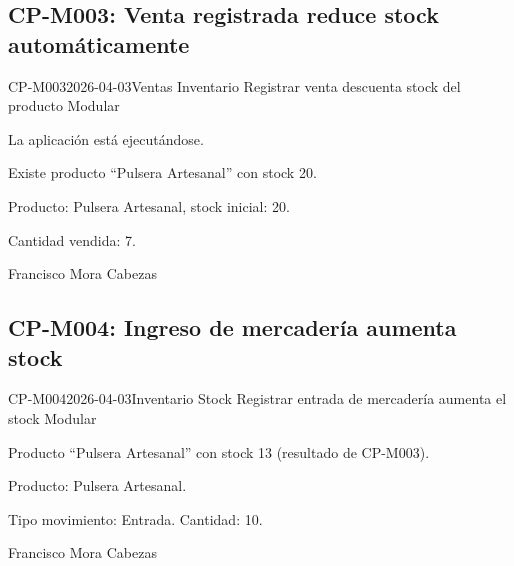 \subsection{CP-M003: Venta registrada reduce stock automáticamente}
\def\cpPasos{%
  \item Verificar stock inicial en ``Inventario'': 20.
  \item Navegar a ``Ventas'' \arr{} nueva venta.
  \item Agregar ``Pulsera Artesanal'' con cantidad 7.
  \item Confirmar la venta.
  \item Volver a ``Inventario'' y verificar nuevo stock.}
\def\cpResultadoE{%
  \item Stock pasa de 20 a 13 automáticamente.}
\def\cpResultadoO{El stock se redujo de 20 a 13 correctamente. La interrelación
  Ventas \arr{} Inventario funciona.}
\casoprueba
  {CP-M003}{2026-04-03}{Ventas \arr{} Inventario}
  {Registrar venta descuenta stock del producto}
  {Modular}{\estadoAprobado}
  {\item La aplicación está ejecutándose.
   \item Existe producto ``Pulsera Artesanal'' con stock 20.}
  {\item Producto: Pulsera Artesanal, stock inicial: 20.
   \item Cantidad vendida: 7.}
  {Francisco Mora Cabezas}

\subsection{CP-M004: Ingreso de mercadería aumenta stock}
\def\cpPasos{%
  \item Navegar a ``Inventario'' \arr{} registrar entrada.
  \item Seleccionar ``Pulsera Artesanal'', cantidad 10.
  \item Confirmar el movimiento.
  \item Verificar nuevo stock.}
\def\cpResultadoE{%
  \item Stock sube de 13 a 23.}
\def\cpResultadoO{El stock subió correctamente de 13 a 23. El módulo de movimientos
  de inventario actualiza el stock correctamente.}
\casoprueba
  {CP-M004}{2026-04-03}{Inventario \arr{} Stock}
  {Registrar entrada de mercadería aumenta el stock}
  {Modular}{\estadoAprobado}
  {\item Producto ``Pulsera Artesanal'' con stock 13 (resultado de CP-M003).}
  {\item Producto: Pulsera Artesanal.
   \item Tipo movimiento: Entrada. Cantidad: 10.}
  {Francisco Mora Cabezas}

